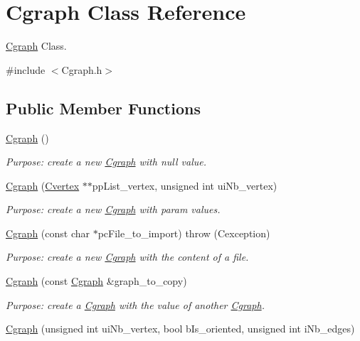 \hypertarget{class_cgraph}{}\section{Cgraph Class Reference}
\label{class_cgraph}


\hyperlink{class_cgraph}{Cgraph} Class.  




{\ttfamily \#include $<$Cgraph.\+h$>$}

\subsection*{Public Member Functions}
\begin{DoxyCompactItemize}
\item 
\hyperlink{class_cgraph_a74d074e30dd30bc9e3b716625db2f4ad}{Cgraph} ()
\begin{DoxyCompactList}\small\item\em Purpose\+: create a new \hyperlink{class_cgraph}{Cgraph} with null value. \end{DoxyCompactList}\item 
\hyperlink{class_cgraph_a0d1eda0e60f9f1b250d18c62b93cb504}{Cgraph} (\hyperlink{class_cvertex}{Cvertex} $\ast$$\ast$pp\+List\+\_\+vertex, unsigned int ui\+Nb\+\_\+vertex)
\begin{DoxyCompactList}\small\item\em Purpose\+: create a new \hyperlink{class_cgraph}{Cgraph} with param values. \end{DoxyCompactList}\item 
\hyperlink{class_cgraph_aa6445aefea2874d90491eee41d976344}{Cgraph} (const char $\ast$pc\+File\+\_\+to\+\_\+import)  throw (\+Cexception)
\begin{DoxyCompactList}\small\item\em Purpose\+: create a new \hyperlink{class_cgraph}{Cgraph} with the content of a file. \end{DoxyCompactList}\item 
\hyperlink{class_cgraph_abcc19e43315769e940188eff5e22f573}{Cgraph} (const \hyperlink{class_cgraph}{Cgraph} \&graph\+\_\+to\+\_\+copy)
\begin{DoxyCompactList}\small\item\em Purpose\+: create a \hyperlink{class_cgraph}{Cgraph} with the value of another \hyperlink{class_cgraph}{Cgraph}. \end{DoxyCompactList}\item 
\hyperlink{class_cgraph_a7774b2533a3ee856fe413a985f031fee}{Cgraph} (unsigned int ui\+Nb\+\_\+vertex, bool b\+Is\+\_\+oriented, unsigned int i\+Nb\+\_\+edges)
$$
\end{DoxyCompactItemize}
